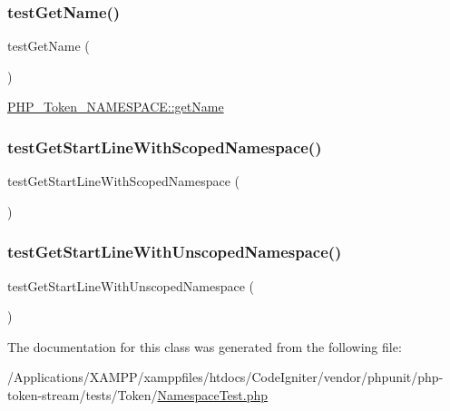 \subsubsection{\texorpdfstring{test\+Get\+Name()}{testGetName()}}
{\footnotesize\ttfamily test\+Get\+Name (\begin{DoxyParamCaption}{ }\end{DoxyParamCaption})}

\mbox{\hyperlink{class_p_h_p___token___n_a_m_e_s_p_a_c_e_a3d0963e68bb313b163a73f2803c64600}{P\+H\+P\+\_\+\+Token\+\_\+\+N\+A\+M\+E\+S\+P\+A\+C\+E\+::get\+Name}} \mbox{\label{class_p_h_p___token___namespace_test_a85d53a8fcf97fa7b53622d46251f71d8}} 
\subsubsection{\texorpdfstring{test\+Get\+Start\+Line\+With\+Scoped\+Namespace()}{testGetStartLineWithScopedNamespace()}}
{\footnotesize\ttfamily test\+Get\+Start\+Line\+With\+Scoped\+Namespace (\begin{DoxyParamCaption}{ }\end{DoxyParamCaption})}

\mbox{\label{class_p_h_p___token___namespace_test_ad6908550db0e328c1fe94a8c77b12cec}} 
\subsubsection{\texorpdfstring{test\+Get\+Start\+Line\+With\+Unscoped\+Namespace()}{testGetStartLineWithUnscopedNamespace()}}
{\footnotesize\ttfamily test\+Get\+Start\+Line\+With\+Unscoped\+Namespace (\begin{DoxyParamCaption}{ }\end{DoxyParamCaption})}



The documentation for this class was generated from the following file\+:\begin{DoxyCompactItemize}
\item 
/\+Applications/\+X\+A\+M\+P\+P/xamppfiles/htdocs/\+Code\+Igniter/vendor/phpunit/php-\/token-\/stream/tests/\+Token/\mbox{\hyperlink{_namespace_test_8php}{Namespace\+Test.\+php}}\end{DoxyCompactItemize}
